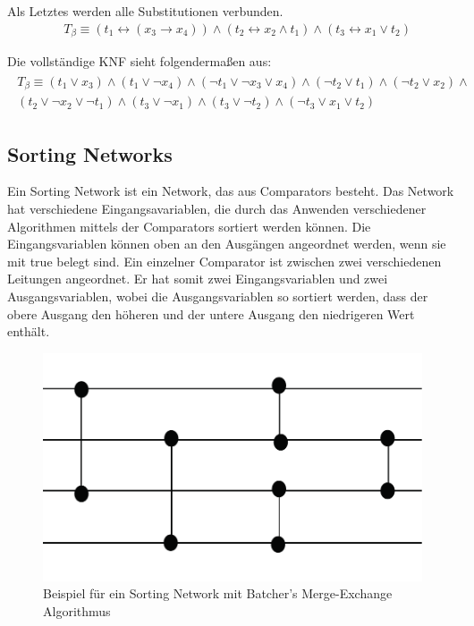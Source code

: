 \documentclass[a4,abstract=on]{scrartcl}
\begin{document}
Als Letztes werden alle Substitutionen verbunden.\\
\begin{align*}
& T_\beta \equiv(t_1 \leftrightarrow (x_3 \rightarrow x_4)) \wedge (t_2 \leftrightarrow x_2 \wedge t_1) \wedge (t_3 \leftrightarrow x_1 \vee t_2)
\end{align*}

Die vollständige KNF sieht folgendermaßen aus:\\
\begin{align*}
\begin{aligned}
T_\beta \equiv (t_1 \vee  x_3) \wedge (t_1 \vee \neg x_4) \wedge (\neg t_1 \vee \neg x_3 \vee x_4) \wedge (\neg t_2 \vee  t_1) \wedge (\neg t_2 \vee x_2) \wedge \\
(t_2 \vee \neg x_2 \vee \neg t_1) \wedge (t_3 \vee  \neg x_1) \wedge (t_3 \vee \neg t_2) \wedge (\neg t_3 \vee x_1 \vee t_2)
\end{aligned}
\end{align*}


\subsection{Sorting Networks}
Ein Sorting Network ist ein Network, das aus Comparators besteht. Das Network hat verschiedene Eingangsavariablen, die durch das Anwenden verschiedener Algorithmen mittels der Comparators sortiert werden können. Die Eingangsvariablen können oben an den Ausgängen angeordnet werden, wenn sie mit true belegt sind. Ein einzelner Comparator ist zwischen zwei verschiedenen Leitungen angeordnet. Er hat somit zwei Eingangsvariablen und zwei Ausgangsvariablen, wobei die Ausgangsvariablen so sortiert werden, dass der obere Ausgang den höheren und der untere Ausgang den niedrigeren Wert enthält.

\begin{figure}[H]
\centering
\includegraphics[width=\textwidth]{sorting_network_grundlage1.pdf}
\caption{Beispiel für ein Sorting Network mit Batcher's Merge-Exchange Algorithmus}
\label{fig:network_grundlage}
\end{figure}
\end{document}
